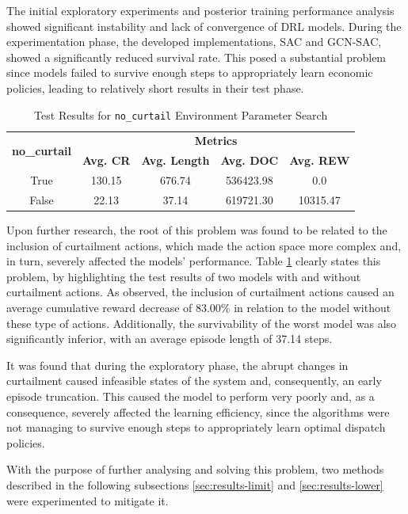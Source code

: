 The initial exploratory experiments and posterior training performance analysis showed significant instability and lack of convergence of \ac{DRL} models. During the experimentation phase, the developed implementations, SAC and GCN-SAC, showed a significantly reduced survival rate. This posed a substantial problem since models failed to survive enough steps to appropriately learn economic policies, leading to relatively short results in their test phase. \par

\begin{table}[h!]
	\centering
	\caption{Test Results for \texttt{no\_curtail} Environment Parameter Search}
	\begin{tabular}{ccccc}
		\toprule
		\multirow{2}{*}{\textbf{no\_curtail}} & \multicolumn{4}{c}{\textbf{Metrics}} \\ 
		\cmidrule(lr){2-5}
		&  \textbf{Avg. CR} & \textbf{Avg. Length} & \textbf{Avg. DOC} & \textbf{Avg. REW} \\ 
		\midrule
		True & 130.15 & 676.74 & 536423.98 & 0.0 \\
		False & 22.13 & 37.14 & 619721.30  & 10315.47  \\
		\bottomrule
	\end{tabular}
	\label{tab:test-curtail}
\end{table}

Upon further research, the root of this problem was found to be related to the inclusion of curtailment actions, which made the action space more complex and, in turn, severely affected the models' performance. Table \ref{tab:test-curtail} clearly states this problem, by highlighting the test results of two models with and without curtailment actions. As observed, the inclusion of curtailment actions caused an average cumulative reward decrease of 83.00\% in relation to the model without these type of actions. Additionally, the survivability of the worst model was also significantly inferior, with an average episode length of 37.14 steps. \par
It was found that during the exploratory phase, the abrupt changes in curtailment caused infeasible states of the system and, consequently, an early episode truncation. This caused the model to perform very poorly and, as a consequence, severely affected the learning efficiency, since the algorithms were not managing to survive enough steps to appropriately learn optimal dispatch policies. \par
With the purpose of further analysing and solving this problem, two methods described in the following subsections \ref{sec:results-limit} and \ref{sec:results-lower} were experimented to mitigate it.


